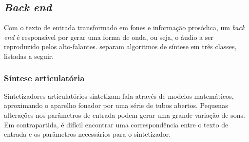 
\subsection{\emph{Back end}}
\label{backend}
Com o texto de entrada transformado em fones e informação prosódica, um
\emph{back end} é responsável por gerar uma forma de onda, ou seja, o áudio a
ser reproduzido pelos alto-falantes.  separam
algoritmos de síntese em três classes, listadas a seguir.

\subsubsection{Síntese articulatória}
Sintetizadores articulatórios sintetizam fala através de modelos matemáticos,
aproximando o aparelho fonador por uma série de tubos abertos. Pequenas
alterações nos parâmetros de entrada podem gerar uma grande variação de sons. Em
contrapartida, é difícil encontrar uma correspondência entre o texto de entrada
e os parâmetros necessários para o sintetizador.

